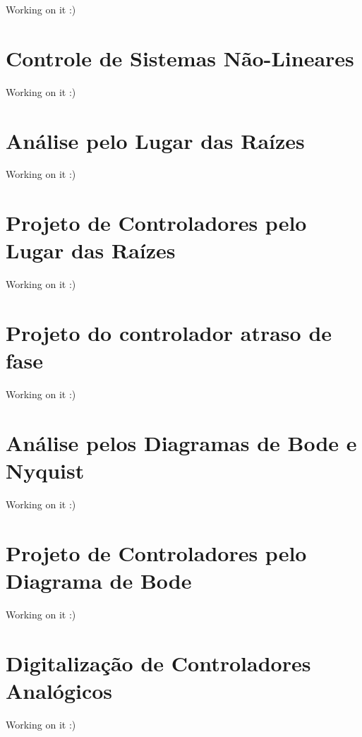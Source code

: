 \documentclass[
]{book}
\begin{document}
Working on it :)

\hypertarget{controle-de-sistemas-nuxe3o-lineares}{%
\chapter{Controle de Sistemas Não-Lineares}\label{controle-de-sistemas-nuxe3o-lineares}}

Working on it :)

\hypertarget{anuxe1lise-pelo-lugar-das-rauxedzes}{%
\chapter{Análise pelo Lugar das Raízes}\label{anuxe1lise-pelo-lugar-das-rauxedzes}}

Working on it :)

\hypertarget{projeto-de-controladores-pelo-lugar-das-rauxedzes}{%
\chapter{Projeto de Controladores pelo Lugar das Raízes}\label{projeto-de-controladores-pelo-lugar-das-rauxedzes}}

Working on it :)

\hypertarget{projeto-do-controlador-atraso-de-fase}{%
\chapter{Projeto do controlador atraso de fase}\label{projeto-do-controlador-atraso-de-fase}}

Working on it :)

\hypertarget{anuxe1lise-pelos-diagramas-de-bode-e-nyquist}{%
\chapter{Análise pelos Diagramas de Bode e Nyquist}\label{anuxe1lise-pelos-diagramas-de-bode-e-nyquist}}

Working on it :)

\hypertarget{projeto-de-controladores-pelo-diagrama-de-bode}{%
\chapter{Projeto de Controladores pelo Diagrama de Bode}\label{projeto-de-controladores-pelo-diagrama-de-bode}}

Working on it :)

\hypertarget{digitalizauxe7uxe3o-de-controladores-analuxf3gicos}{%
\chapter{Digitalização de Controladores Analógicos}\label{digitalizauxe7uxe3o-de-controladores-analuxf3gicos}}

Working on it :)

  
\end{document}
